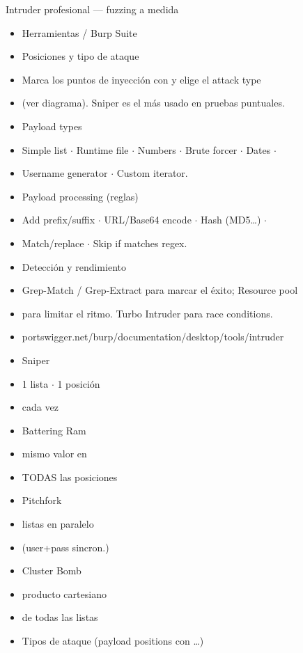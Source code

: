 \documentclass[aspectratio=169,10pt]{beamer}
\begin{document}
\begin{frame}[allowframebreaks]{Intruder profesional --- fuzzing a medida}
\small
  \begin{itemize}
  \item Herramientas / Burp Suite
  \item Posiciones y tipo de ataque
  \item Marca los puntos de inyección con y elige el attack type
  \item (ver diagrama). Sniper es el más usado en pruebas puntuales.
  \item Payload types
  \item Simple list $\cdot$ Runtime file $\cdot$ Numbers $\cdot$ Brute forcer $\cdot$ Dates $\cdot$
  \item Username generator $\cdot$ Custom iterator.
  \item Payload processing (reglas)
  \item Add prefix/suffix $\cdot$ URL/Base64 encode $\cdot$ Hash (MD5\dots{}) $\cdot$
  \item Match/replace $\cdot$ Skip if matches regex.
  \item Detección y rendimiento
  \item Grep-Match / Grep-Extract para marcar el éxito; Resource pool
  \item para limitar el ritmo. Turbo Intruder para race conditions.
  \item portswigger.net/burp/documentation/desktop/tools/intruder
  \item Sniper
  \item 1 lista $\cdot$ 1 posición
  \item cada vez
  \item Battering Ram
  \item mismo valor en
  \item TODAS las posiciones
  \item Pitchfork
  \item listas en paralelo
  \item (user+pass sincron.)
  \item Cluster Bomb
  \item producto cartesiano
  \item de todas las listas
  \item Tipos de ataque (payload positions con \dots{})
  \end{itemize}
\end{frame}
\end{document}
